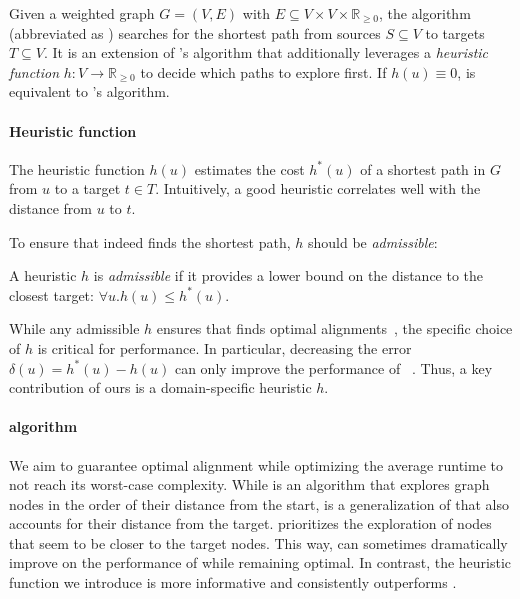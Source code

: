 Given a weighted graph $G=(V,E)$ with $E \subseteq V \times V \times
\mathbb{R}_{\geq 0}$, the \A algorithm (abbreviated as \A) searches for the
shortest path from sources $S \subseteq V$ to targets $T \subseteq V$. It is an
extension of \dijkstra's algorithm that additionally leverages a \emph{heuristic
function} $h \colon V \to \mathbb{R}_{\geq 0}$ to decide which paths to explore
first.
%
If $h(u) \equiv 0$, \A is equivalent to \dijkstra's algorithm.

\paragraph{Heuristic function}
The heuristic function $h(u)$ estimates the
cost $h^*(u)$ of a shortest path in $G$ from $u$ to a target $t \in T$. Intuitively, a
good heuristic correlates well with the distance from $u$ to $t$.

To ensure that \A indeed finds the shortest path, $h$ should be
\emph{admissible}:

\begin{definition} A heuristic $h$ is \emph{admissible}
    if it provides a lower bound on the distance to the closest target: $\forall
    u. h(u) \leq h^*(u)$.
\end{definition}

While any admissible $h$ ensures that \A finds optimal
alignments~\cite{dechter_generalized_1985}, the specific choice of $h$
is critical for performance. In particular, decreasing the error $\delta(u) =
h^*(u)-h(u)$ can only improve the performance of
\A~\cite{dechter_generalized_1985}. Thus, a key contribution of ours is
a domain-specific heuristic $h$.

\paragraph{\A algorithm}
We aim to guarantee optimal alignment while optimizing the average runtime
to not reach its worst-case complexity. While \dijkstra is an algorithm that
explores graph nodes in the order of their distance from the start, \A is a
generalization of \dijkstra that also accounts for their distance from the
target. \A prioritizes the exploration of nodes that seem to be closer to the
target nodes. This way, \A can sometimes dramatically improve on the performance
of \dijkstra while remaining optimal.
%
In contrast, the heuristic function we introduce is more informative and
consistently outperforms \dijkstra.

